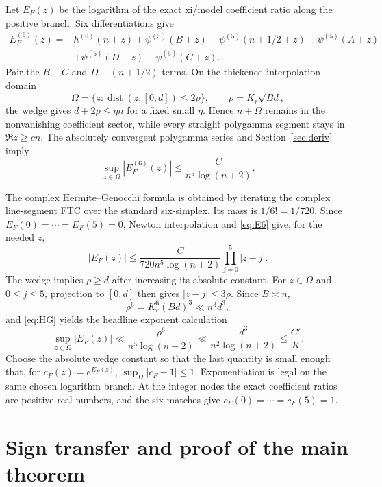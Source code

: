 \documentclass[11pt]{article}
\theoremstyle{definition}
\theoremstyle{remark}
\begin{document}
Let $E_F(z)$ be the logarithm of the exact xi/model coefficient ratio along
the positive branch.  Six differentiations give
\begin{align*}
E_F^{(6)}(z)={}&h^{(6)}(n+z)+\psi^{(5)}(B+z)
-\psi^{(5)}(n+1/2+z)-\psi^{(5)}(A+z)\\
&+\psi^{(5)}(D+z)-\psi^{(5)}(C+z).
\end{align*}
Pair the $B-C$ and $D-(n+1/2)$ terms.  On the thickened interpolation domain
\[
 \Omega=\{z:\operatorname{dist}(z,[0,d])\le2\rho\},\qquad
 \rho=K_r\sqrt{Bd},
\]
the wedge gives $d+2\rho\le\eta n$ for a fixed small $\eta$.  Hence
$n+\Omega$ remains in the nonvanishing coefficient sector, while every
straight polygamma segment stays in $\Re z\ge cn$.  The absolutely convergent
polygamma series and Section~\ref{sec:deriv} imply
\begin{equation}\label{eq:E6}
 \sup_{z\in\Omega}|E_F^{(6)}(z)|
 \le \frac{C}{n^5\log(n+2)}.
\end{equation}

The complex Hermite--Genocchi formula is obtained by iterating the complex
line-segment FTC over the standard six-simplex.  Its mass is $1/6!=1/720$.
Since $E_F(0)=\cdots=E_F(5)=0$, Newton interpolation and
\eqref{eq:E6} give, for the needed $z$,
\begin{equation}\label{eq:HG}
 |E_F(z)|\le \frac{C}{720n^5\log(n+2)}
       \prod_{j=0}^{5}|z-j|.
\end{equation}
The wedge implies $\rho\ge d$ after increasing its absolute constant.  For
$z\in\Omega$ and $0\le j\le5$, projection to $[0,d]$ then gives
$|z-j|\le3\rho$.  Since $B\asymp n$,
\[
 \rho^6=K_r^6(Bd)^3\ll n^3d^3,
\]
and \eqref{eq:HG} yields the headline exponent calculation
\begin{equation}\label{eq:exponent}
 \sup_{z\in\Omega}|E_F(z)|
 \ll\frac{\rho^6}{n^5\log(n+2)}
 \ll\frac{d^3}{n^2\log(n+2)}\le\frac{C'}K.
\end{equation}
Choose the absolute wedge constant so that the last quantity is small enough
that, for $c_F(z)=e^{E_F(z)}$,
$\sup_\Omega|c_F-1|\le1$.  Exponentiation is legal on the same chosen
logarithm branch.  At the integer nodes the exact coefficient ratios are
positive real numbers, and the six matches give
$c_F(0)=\cdots=c_F(5)=1$.

\section{Sign transfer and proof of the main theorem}\label{sec:assembly}
\end{document}
